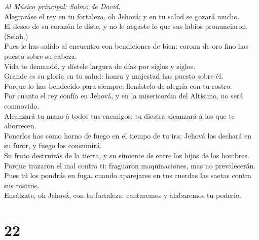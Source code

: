 \emph{Al Músico principal: Salmo de David.}\\
Alegraráse el rey en tu fortaleza, oh Jehová; y en tu salud se gozará
mucho.\\
 El deseo de su corazón le diste, y no le negaste lo que sus
labios pronunciaron. (Selah.)\\
 Pues le has salido al encuentro con bendiciones de bien:
corona de oro fino has puesto sobre su cabeza.\\
 Vida te demandó, y dístele largura de días por siglos y
siglos.\\
 Grande es su gloria en tu salud: honra y majestad has
puesto sobre él.\\
 Porque lo has bendecido para siempre; llenástelo de alegría
con tu rostro.\\
 Por cuanto el rey confía en Jehová, y en la misericordia
del Altísimo, no será conmovido.\\
 Alcanzará tu mano á todos tus enemigos; tu diestra
alcanzará á los que te aborrecen.\\
 Ponerlos has como horno de fuego en el tiempo de tu ira:
Jehová los deshará en su furor, y fuego los consumirá.\\
 Su fruto destruirás de la tierra, y su simiente de entre
los hijos de los hombres.\\
 Porque trazaron el mal contra ti: fraguaron maquinaciones,
mas no prevalecerán.\\
 Pues tú los pondrás en fuga, cuando aparejares en tus
cuerdas las saetas contra sus rostros.\\
 Ensálzate, oh Jehová, con tu fortaleza: cantaremos y
alabaremos tu poderío.

\hypertarget{section-21}{%
\section{22}\label{section-21}}

